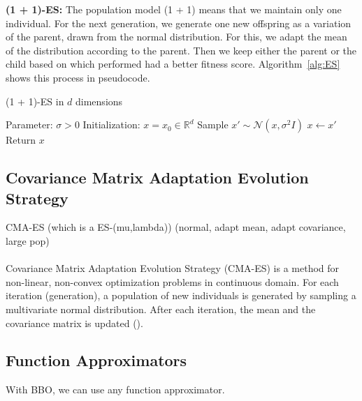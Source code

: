 \textbf{(1 + 1)-ES:} The population model (1 + 1) means that we maintain only one individual. For the next generation, we generate one new offspring as a variation of the parent, drawn from the normal distribution. For this, we adapt the mean of the distribution according to the parent. Then we keep either the parent or the child based on which performed had a better fitness score. Algorithm~\ref{alg:ES} shows this process in pseudocode.
\begin{algorithm}
\caption{(1 + 1)-ES in $d$ dimensions}
\begin{algorithmic}[1]
\State Parameter: $\sigma > 0$
\State Initialization: $x = x_0 \in \mathbb{R}^d$
    \State Sample $x' \sim \mathcal{N}(x, \sigma^2 I)$
      \State $x \leftarrow x'$
    \EndIf
\EndWhile
\State Return $x$
\end{algorithmic}
\label{alg:ES}
\end{algorithm}



\subsection{Covariance Matrix Adaptation Evolution Strategy}
CMA-ES (which is a ES-(mu,lambda)) (normal, adapt mean, adapt covariance, large pop) \\ \\
Covariance Matrix Adaptation Evolution Strategy (CMA-ES) is a method for non-linear, non-convex optimization problems in continuous domain. For each iteration (generation), a population of new individuals is generated by sampling a multivariate normal distribution. After each iteration, the mean and the covariance matrix is updated (\cite{hansen2016cma}).


\subsection{Function Approximators}
With BBO, we can use any function approximator.

